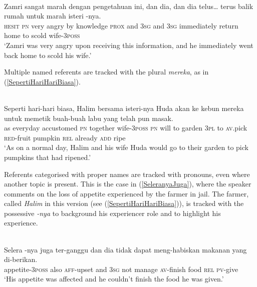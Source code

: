 \documentclass[output=paper
,modfonts
,nonflat]{langsci/langscibook}
\begin{document}
\ea\label{ZamriSangatMarah} 
\\
     {\ob}Zamri{\cb}       sangat marah dengan pengetahuan ini, dan  {\ob}dia{\cb}, dan   {\ob}dia{\cb} {telus\ldots} terus       balik  rumah untuk marah isteri {\ob}-nya{\cb}.\\
	\textsc{hesit} \textsc{pn} very angry        by     knowledge   \textsc{prox} and  \textsc{3sg} and  \textsc{3sg} {} immediately return home  to    scold wife-\textsc{3poss}\\
\glt `Zamri was very angry upon receiving this information, and he immediately went back home to scold his wife.'
\z

\noindent
Multiple named referents are tracked with the plural \emph{mereka}, as in (\ref{SepertiHariHariBiasa}).

\ea\label{SepertiHariHariBiasa} 
\\
\gll  Seperti hari-hari biasa,     Halim       bersama  isteri-nya     Huda        akan ke   kebun  mereka untuk memetik buah-buah      labu    yang telah pun       masak.\\
as      everyday  accustomed \textsc{pn} together wife-\textsc{3poss} \textsc{pn} will to   garden \textsc{3pl} to   \textsc{av.}pick    \textsc{red}-fruit pumpkin \textsc{rel}  already \textsc{add}  ripe\\
\glt `As on a normal day, Halim and his wife Huda would go to their garden to pick pumpkins that had ripened.'
\z

\noindent
Referents categorised with proper names are tracked with pronouns, even where another topic is present. This is the case in (\ref{SeleranyaJuga}), where the speaker comments on the loss of appetite experienced by the farmer in jail. The farmer, called \emph{Halim} in this version (see (\ref{SepertiHariHariBiasa})), is tracked with the possessive \emph{-nya} to background his  experiencer role and to highlight his experience.

\ea\label{SeleranyaJuga} 
\\
\gll  Selera {\ob}-nya{\cb}      juga ter-ganggu dan   {\ob}dia{\cb} tidak dapat meng-habiskan makanan yang di-berikan.\\
appetite-\textsc{3poss} also \textsc{aff}-upset     and  \textsc{3sg} not manage       \textsc{av-}finish       food    \textsc{rel}  \textsc{pv-}give\\
\glt `His appetite was affected and he couldn't finish the food he was given.'
\z
\end{document}
